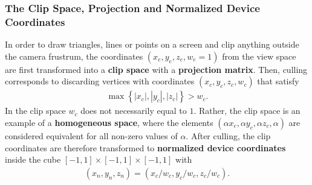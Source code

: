 \documentclass [12pt, a4paper] {article}
\begin{document}
\subsubsection{The Clip Space, Projection and Normalized Device Coordinates}
In order to draw triangles, lines or points on a screen and clip anything outside the camera 
frustrum, the coordinates $(x_e, y_e, z_e, w_e = 1)$ from the view space are first 
transformed into a \textbf{clip space} with a \textbf{projection matrix}. Then, culling 
corresponds to discarding vertices with coordinates $(x_c, y_c, z_c, w_c)$ that satisfy
\begin {eqnarray}
    \label{eq:culling}
    \max\left\{|x_c|, |y_c|, |z_c|\right\} > w_c.
\end {eqnarray}
In the clip space $w_c$ does not necessarily equal to $1$. Rather, the clip space is 
an example of a \textbf{homogeneous space}, where the elements  
$(\alpha x_c, \alpha y_c, \alpha z_c, \alpha)$ are considered equivalent for all non-zero 
values of $\alpha$. After culling, the clip coordinates are therefore 
transformed to \textbf{normalized device coordinates} inside the cube 
$[-1, 1]\times[-1, 1]\times[-1, 1]$ with 
\begin {eqnarray}
    (x_n, y_n, z_n) = \left(x_c/w_c, y_c/w_c, z_c/w_c\right).
\end {eqnarray}
\end{document}
